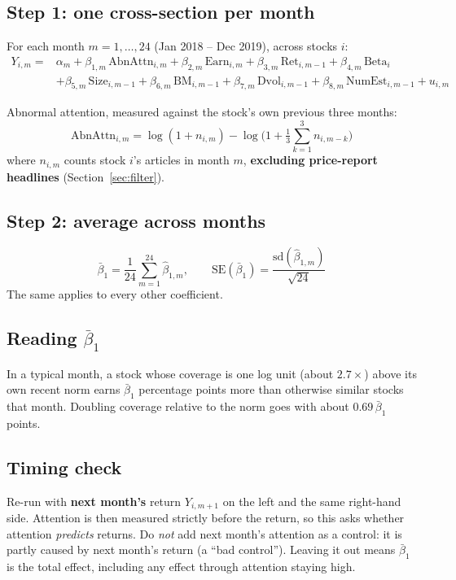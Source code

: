 \documentclass[11pt]{article}
\begin{document}
\subsection*{Step 1: one cross-section per month}
For each month $m = 1,\dots,24$ (Jan 2018 -- Dec 2019), across stocks $i$:
\begin{align*}
Y_{i,m} = {}& \alpha_m + \beta_{1,m}\,\text{AbnAttn}_{i,m} + \beta_{2,m}\,\text{Earn}_{i,m} + \beta_{3,m}\,\text{Ret}_{i,m-1} + \beta_{4,m}\,\text{Beta}_{i}\\
&+ \beta_{5,m}\,\text{Size}_{i,m-1} + \beta_{6,m}\,\text{BM}_{i,m-1} + \beta_{7,m}\,\text{Dvol}_{i,m-1} + \beta_{8,m}\,\text{NumEst}_{i,m-1} + u_{i,m}
\end{align*}

Abnormal attention, measured against the stock's own previous three months:
\[
\text{AbnAttn}_{i,m} = \log(1+n_{i,m}) - \log\!\Big(1+\tfrac{1}{3}\textstyle\sum_{k=1}^{3} n_{i,m-k}\Big)
\]
where $n_{i,m}$ counts stock $i$'s articles in month $m$, \textbf{excluding price-report headlines} (Section~\ref{sec:filter}).

\subsection*{Step 2: average across months}
\[
\bar\beta_1 = \frac{1}{24}\sum_{m=1}^{24}\hat\beta_{1,m}, \qquad
\text{SE}(\bar\beta_1) = \frac{\text{sd}(\hat\beta_{1,m})}{\sqrt{24}}
\]
The same applies to every other coefficient.

\subsection*{Reading $\bar\beta_1$}
In a typical month, a stock whose coverage is one log unit (about $2.7\times$) above its own recent norm earns $\bar\beta_1$ percentage points more than otherwise similar stocks that month. Doubling coverage relative to the norm goes with about $0.69\,\bar\beta_1$ points.

\subsection*{Timing check}
Re-run with \textbf{next month's} return $Y_{i,m+1}$ on the left and the same right-hand side. Attention is then measured strictly before the return, so this asks whether attention \emph{predicts} returns. Do \emph{not} add next month's attention as a control: it is partly caused by next month's return (a ``bad control''). Leaving it out means $\bar\beta_1$ is the total effect, including any effect through attention staying high.
\end{document}
